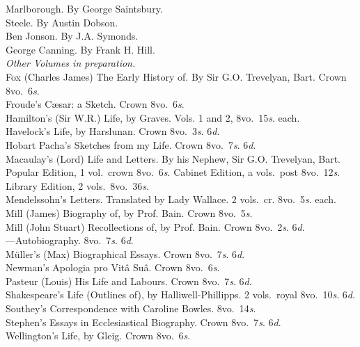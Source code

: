 \documentclass[letterpaper,12pt,oneside,openany]{memoir}
\newcommand{\D}{\hspace*{5mm}}
\newcommand{\E}{\hspace*{2mm}---\hspace*{2mm}}
\begin{document}
\begin{footnotesize}
\D Marlborough. By George Saintsbury.\\
\D Steele. By Austin Dobson.\\
\D Ben Jonson. By J.A. Symonds.\\
\D George Canning. By Frank H. Hill.\\
\emph{Other Volumes in preparation.}\\[3mm]
Fox (Charles James) The Early History of. By Sir G.O. Trevelyan, Bart. Crown 8vo.\ 6\textit{s}.\\
Froude's C{\ae}sar: a Sketch. Crown 8vo.\ 6\textit{s}.\\
Hamilton's (Sir W.R.) Life, by Graves. Vols. 1 and 2, 8vo.\ 15\textit{s}. each.\\
Havelock's Life, by Harslunan. Crown 8vo.\ 3\textit{s}. 6\textit{d}.\\
Hobart Pacha's Sketches from my Life. Crown 8vo.\ 7\textit{s}. 6\textit{d}.\\
Macaulay's (Lord) Life and Letters. By his Nephew, Sir G.O. Trevelyan, Bart. \\
\D Popular Edition, 1 vol.\ crown 8vo.\ 6\textit{s}. Cabinet Edition, a vols.\ post 8vo.\ 12\textit{s}. \\
\D Library Edition, 2 vols.\ 8vo.\ 36\textit{s}.\\
Mendelssohn's Letters. Translated by Lady Wallace. 2 vols.\ cr. 8vo.\ 5\textit{s}. each.\\
Mill (James) Biography of, by Prof. Bain. Crown 8vo.\ 5\textit{s}.\\
Mill (John Stuart) Recollections of, by Prof. Bain. Crown 8vo.\ 2\textit{s}. 6\textit{d}.\\
\E Autobiography. 8vo.\ 7\textit{s}. 6\textit{d}.\\
M\"uller's (Max) Biographical Essays. Crown 8vo.\ 7\textit{s}. 6\textit{d}.\\
Newman's Apologia pro Vit{\^a} Su{\^a}. Crown 8vo.\ 6\textit{s}.\\
Pasteur (Louis) His Life and Labours. Crown 8vo.\ 7\textit{s}. 6\textit{d}.\\
Shakespeare's Life (Outlines of), by Halliwell-Phillipps. 2 vols.\ royal 8vo.\ 10\textit{s}. 6\textit{d}.\\
Southey's Correspondence with Caroline Bowles. 8vo.\ 14\textit{s}.\\
Stephen's Essays in Ecclesiastical Biography. Crown 8vo.\ 7\textit{s}. 6\textit{d}.\\
Wellington's Life, by Gleig. Crown 8vo.\ 6\textit{s}.

\end{footnotesize}
\end{document}
